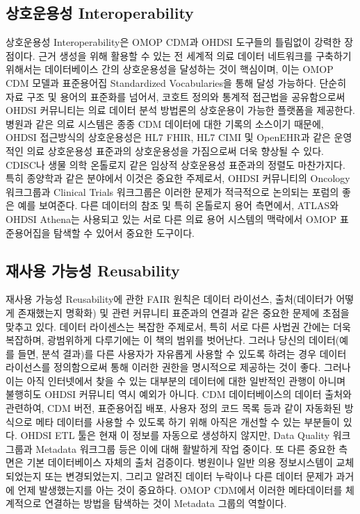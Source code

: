 \documentclass[10.5pt]{book}
\theoremstyle{definition}
\theoremstyle{definition}
\theoremstyle{definition}
\theoremstyle{remark}
\begin{document}
\subsection{상호운용성 Interoperability}\label{-interoperability}

상호운용성 Interoperability은 OMOP CDM과 OHDSI 도구들의 틀림없이 강력한
장점이다. 근거 생성을 위해 활용할 수 있는 전 세계적 의료 데이터
네트워크를 구축하기 위해서는 데이터베이스 간의 상호운용성을 달성하는
것이 핵심이며, 이는 OMOP CDM 모델과 표준용어집 Standardized
Vocabularies을 통해 달성 가능하다. 단순히 자료 구조 및 용어의 표준화를
넘어서, 코호트 정의와 통계적 접근법을 공유함으로써 OHDSI 커뮤니티는 의료
데이터 분석 방법론의 상호운용이 가능한 플랫폼을 제공한다. 병원과 같은
의료 시스템은 종종 CDM 데이터에 대한 기록의 소스이기 때문에, OHDSI
접근방식의 상호운용성은 HL7 FHIR, HL7 CIMI 및 OpenEHR과 같은 운영적인
의료 상호운용성 표준과의 상호운용성을 가짐으로써 더욱 향상될 수 있다.
CDISC나 생물 의학 온톨로지 같은 임상적 상호운용성 표준과의 정렬도
마찬가지다. 특히 종양학과 같은 분야에서 이것은 중요한 주제로서, OHDSI
커뮤니티의 Oncology 워크그룹과 Clinical Trials 워크그룹은 이러한 문제가
적극적으로 논의되는 포럼의 좋은 예를 보여준다. 다른 데이터의 참조 및
특히 온톨로지 용어 측면에서, ATLAS와 OHDSI Athena는 사용되고 있는 서로
다른 의료 용어 시스템의 맥락에서 OMOP 표준용어집을 탐색할 수 있어서
중요한 도구이다.

\subsection{재사용 가능성 Reusability}\label{--reusability}

재사용 가능성 Reusability에 관한 FAIR 원칙은 데이터 라이선스,
출처(데이터가 어떻게 존재했는지 명확화) 및 관련 커뮤니티 표준과의 연결과
같은 중요한 문제에 초점을 맞추고 있다. 데이터 라이센스는 복잡한
주제로서, 특히 서로 다른 사법권 간에는 더욱 복잡하며, 광범위하게
다루기에는 이 책의 범위를 벗어난다. 그러나 당신의 데이터(예를 들면, 분석
결과)를 다른 사용자가 자유롭게 사용할 수 있도록 하려는 경우 데이터
라이선스를 정의함으로써 통해 이러한 권한을 명시적으로 제공하는 것이
좋다. 그러나 이는 아직 인터넷에서 찾을 수 있는 대부분의 데이터에 대한
일반적인 관행이 아니며 불행히도 OHDSI 커뮤니티 역시 예외가 아니다. CDM
데이터베이스의 데이터 출처와 관련하여, CDM 버전, 표준용어집 배포, 사용자
정의 코드 목록 등과 같이 자동화된 방식으로 메타 데이터를 사용할 수
있도록 하기 위해 아직은 개선할 수 있는 부분들이 있다. OHDSI ETL 툴은
현재 이 정보를 자동으로 생성하지 않지만, Data Quality 워크 그룹과
Metadata 워크그룹 등은 이에 대해 활발하게 작업 중이다. 또 다른 중요한
측면은 기본 데이터베이스 자체의 출처 검증이다. 병원이나 일반 의용
정보시스템이 교체되었는지 또는 변경되었는지, 그리고 알려진 데이터
누락이나 다른 데이터 문제가 과거에 언제 발생했는지를 아는 것이 중요하다.
OMOP CDM에서 이러한 메타데이터를 체계적으로 연결하는 방법을 탐색하는
것이 Metadata 그룹의 역할이다.
\end{document}
